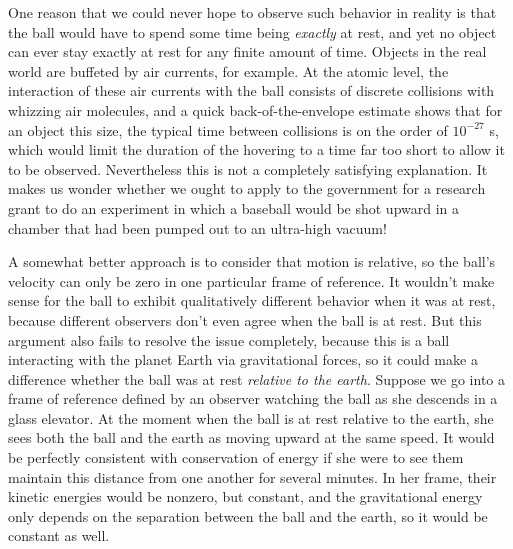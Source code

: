 One reason that we could never hope to observe such behavior in reality is that the ball would have
to spend some time being \emph{exactly} at rest,
and yet no object can ever stay exactly at rest for any finite amount of time. Objects in the real
world are buffeted by air currents, for example. At the atomic level, the interaction of these air currents
with the ball consists of discrete collisions with whizzing air molecules, and a quick back-of-the-envelope
estimate shows that for an object this size, the typical time between collisions is on the order of
$10^{-27}$ s, which would limit the duration of the hovering to a time far too short to allow it to be
observed.
Nevertheless this is not a completely satisfying explanation. It makes us wonder whether we ought to apply
to the government for a research grant to do an experiment in which a baseball would be shot upward in
a chamber that had been pumped out to an ultra-high vacuum!

A somewhat better approach is to consider that motion is relative, so
the ball's velocity can only be zero in one particular frame of reference. It wouldn't make sense for
the ball to exhibit qualitatively different behavior when it was at rest, because different observers
don't even agree when the ball is at rest. But this argument also fails to resolve the issue completely,
because this is a ball interacting with the planet Earth via gravitational forces, so it could make a difference
whether the ball was at rest \emph{relative to the earth}. Suppose we go into a frame of reference defined
by an observer watching the ball as she descends in a glass elevator. At the moment when the ball is at rest
relative to the earth, she sees both the ball and the earth as moving upward at the same speed. It would be perfectly consistent
with conservation of energy if she were to see them maintain this distance from one another
for several minutes. In her frame, their kinetic energies would be nonzero, but constant, and the gravitational
energy only depends on the separation between the ball and the earth, so it would be constant as well.

